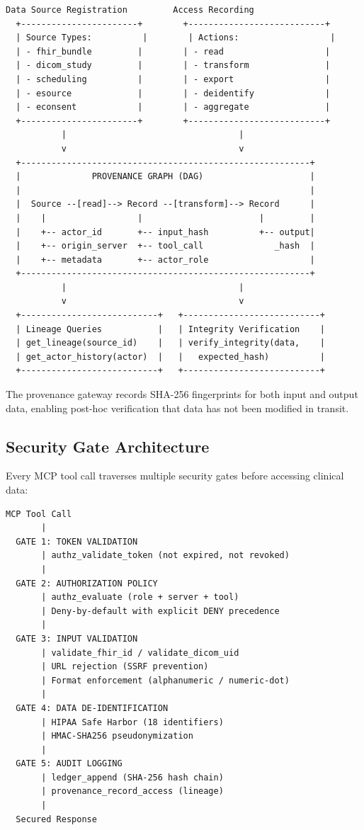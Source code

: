 \documentclass[10pt,letterpaper]{article}
\begin{document}
\begin{lstlisting}[title={\textbf{Provenance Gateway: Cross-System Lineage Tracking}}]
  Data Source Registration         Access Recording
  +-----------------------+        +---------------------------+
  | Source Types:          |        | Actions:                  |
  | - fhir_bundle         |        | - read                    |
  | - dicom_study         |        | - transform               |
  | - scheduling          |        | - export                  |
  | - esource             |        | - deidentify              |
  | - econsent            |        | - aggregate               |
  +-----------------------+        +---------------------------+
           |                                  |
           v                                  v
  +---------------------------------------------------------+
  |              PROVENANCE GRAPH (DAG)                     |
  |                                                         |
  |  Source --[read]--> Record --[transform]--> Record      |
  |    |                  |                       |         |
  |    +-- actor_id       +-- input_hash          +-- output|
  |    +-- origin_server  +-- tool_call              _hash  |
  |    +-- metadata       +-- actor_role                    |
  +---------------------------------------------------------+
           |                                  |
           v                                  v
  +---------------------------+   +---------------------------+
  | Lineage Queries           |   | Integrity Verification    |
  | get_lineage(source_id)    |   | verify_integrity(data,    |
  | get_actor_history(actor)  |   |   expected_hash)          |
  +---------------------------+   +---------------------------+
\end{lstlisting}

The provenance gateway records SHA-256 fingerprints for both input and output data, enabling post-hoc verification that data has not been modified in transit.

\subsection{Security Gate Architecture}

Every MCP tool call traverses multiple security gates before accessing clinical data:

\begin{lstlisting}[title={\textbf{Security Gate Architecture (5 Gates)}}]
  MCP Tool Call
       |
  GATE 1: TOKEN VALIDATION
       | authz_validate_token (not expired, not revoked)
       |
  GATE 2: AUTHORIZATION POLICY
       | authz_evaluate (role + server + tool)
       | Deny-by-default with explicit DENY precedence
       |
  GATE 3: INPUT VALIDATION
       | validate_fhir_id / validate_dicom_uid
       | URL rejection (SSRF prevention)
       | Format enforcement (alphanumeric / numeric-dot)
       |
  GATE 4: DATA DE-IDENTIFICATION
       | HIPAA Safe Harbor (18 identifiers)
       | HMAC-SHA256 pseudonymization
       |
  GATE 5: AUDIT LOGGING
       | ledger_append (SHA-256 hash chain)
       | provenance_record_access (lineage)
       |
  Secured Response
\end{lstlisting}
\end{document}
